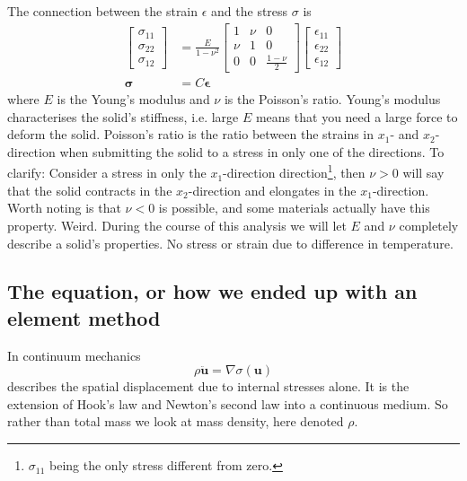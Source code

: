\documentclass[paper=a4, fontsize=11pt]{scrartcl} %
\begin{document}
The connection between the strain $\epsilon$ and the stress $\sigma$ is
\begin{align*}
\begin{bmatrix}
\sigma_{11} \\ \sigma_{22} \\ \sigma_{12}
\end{bmatrix}
&= \frac{E}{1-\nu^2}\begin{bmatrix}
1 & \nu & 0 \\
\nu & 1 & 0 \\
0 & 0 & \frac{1-\nu}{2}
\end{bmatrix}
\begin{bmatrix}
\epsilon_{11} \\ \epsilon_{22} \\ \epsilon_{12}
\end{bmatrix} \\
\boldsymbol{\sigma} &= C\boldsymbol{\epsilon}
\end{align*}
where $E$ is the Young's modulus and $\nu$ is the Poisson's ratio. Young's modulus characterises the solid's stiffness, i.e. large $E$ means that you need a large force to deform the solid. Poisson's ratio  is the ratio between the strains in $x_1$- and $x_2$-direction when submitting the solid to a stress in only one of the directions. To clarify: Consider a stress in only the $x_1$-direction direction\footnote{$\sigma_{11}$ being the only stress different from zero.}, then $\nu>0$ will say that the solid contracts in the $x_2$-direction and elongates in the $x_1$-direction. Worth noting is that $\nu<0$ is possible, and some materials actually have this property. Weird.
During the course of this analysis we will let $E$ and $\nu$ completely describe a solid's properties. No stress or strain due to difference in temperature.

\subsection*{The equation, or how we ended up with an element method}
In continuum mechanics
\begin{equation}
\label{vibDiff}
\rho \ddot{\boldsymbol{u}} = \nabla \sigma(\boldsymbol{u})
\end{equation}
describes the spatial displacement due to internal stresses alone. It is the extension of Hook's law and Newton's second law into a continuous medium. So rather than total mass we look at mass density, here denoted $\rho$.
\end{document}
